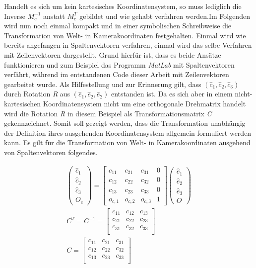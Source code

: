 	Handelt es sich um kein kartesisches Koordinatensystem, so muss lediglich die Inverse \ensuremath{M_c^{-1}} anstatt \ensuremath{M_c^T} gebildet und wie gehabt verfahren werden.Im Folgenden wird nun noch einmal kompakt und in einer symbolischen Schreibweise die Transformation von Welt- in Kamerakoordinaten  festgehalten. Einmal wird wie bereits angefangen in Spaltenvektoren verfahren, einmal wird das selbe Verfahren mit Zeilenvektoren dargestellt. Grund hierfür ist, dass es beide Ansätze funktionieren und zum Beispiel das Programm \textit{MatLab} mit Spaltenvektoren verfährt, während im entstandenen Code dieser Arbeit mit Zeilenvektoren gearbeitet wurde. 
	Als Hilfestellung und zur Erinnerung gilt, dass \ensuremath{(\hat{c}_1,\hat{c}_2,\hat{c}_3)} durch Rotation \textit{R} aus \ensuremath{(\hat{e}_1,\hat{e}_2,\hat{e}_2)} entstanden ist. Da es sich aber in einem nicht-kartesischen Koordinatensystem nicht um eine orthogonale Drehmatrix handelt wird die Rotation \textit{R} in diesem Beispiel als Transformationsmatrix \textit{C} gekennzeichnet. Somit soll gezeigt werden, dass die Transformation unabhängig der Definition ihres ausgehenden Koordinatensystem allgemein formuliert werden kann. Es gilt für die Transformation von Welt- in Kamerakoordinaten ausgehend von Spaltenvektoren folgendes.
	
	\begin{gather}
	\begin{pmatrix}
	\hat{c}_1\\
	\hat{c}_2\\
	\hat{c}_3\\
	O_c
	\end{pmatrix} = 
	\begin{bmatrix}
	c_{11} & c_{21} & c_{31} & 0\\
	c_{12} & c_{22} & c_{32} & 0\\
	c_{13} & c_{23} & c_{33} & 0\\
	o_{c,1} & o_{c,2} & o_{c,3} & 1
	\end{bmatrix}
	\begin{pmatrix}
	\hat{e}_1\\
	\hat{e}_2\\
	\hat{e}_3\\
	O
	\end{pmatrix}\\
	C^T = C^{-1}= \begin{bmatrix}
	c_{11} & c_{12} & c_{13} \\
	c_{21} & c_{22} & c_{23} \\
	c_{31} & c_{32} & c_{33} \\
	\end{bmatrix}\\
	C = \begin{bmatrix}
	c_{11} & c_{21} & c_{31} \\
	c_{12} & c_{22} & c_{32} \\
	c_{13} & c_{23} & c_{33} \\
	\end{bmatrix}
	\end{gather}

